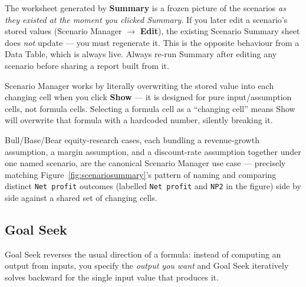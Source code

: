 \documentclass[11pt,a4paper]{article}
\begin{document}
\begin{pitfall}
The worksheet generated by \textbf{Summary} is a frozen picture of the scenarios \emph{as they existed at the moment you clicked Summary}. If you later edit a scenario's stored values (Scenario Manager $\rightarrow$ \textbf{Edit}), the existing Scenario Summary sheet does \emph{not} update --- you must regenerate it. This is the opposite behaviour from a Data Table, which is always live. Always re-run Summary after editing any scenario before sharing a report built from it.
\end{pitfall}

\begin{pitfall}
Scenario Manager works by literally overwriting the stored value into each changing cell when you click \textbf{Show} --- it is designed for pure input/assumption cells, not formula cells. Selecting a formula cell as a ``changing cell'' means Show will overwrite that formula with a hardcoded number, silently breaking it.
\end{pitfall}

\begin{financeapp}
Bull/Base/Bear equity-research cases, each bundling a revenue-growth assumption, a margin assumption, and a discount-rate assumption together under one named scenario, are the canonical Scenario Manager use case --- precisely matching Figure~\ref{fig:scenariosummary}'s pattern of naming and comparing distinct \texttt{Net profit} outcomes (labelled \texttt{Net profit} and \texttt{NP2} in the figure) side by side against a shared set of changing cells.
\end{financeapp}

\subsection{Goal Seek}
\label{sec:goalseek}

Goal Seek reverses the usual direction of a formula: instead of computing an output from inputs, you specify the \emph{output you want} and Goal Seek iteratively solves backward for the single input value that produces it.
\end{document}
